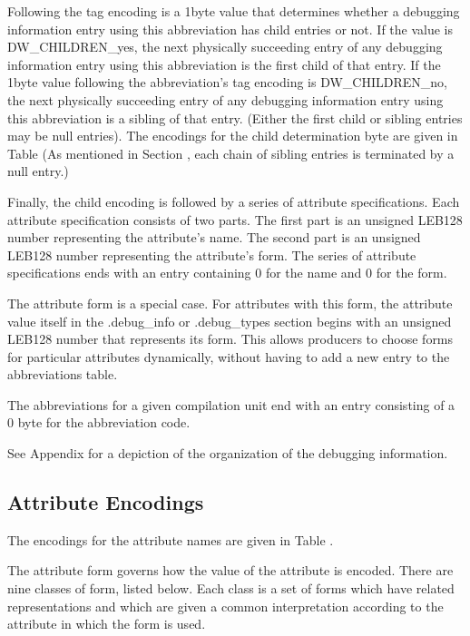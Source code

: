 Following the tag encoding is a 1\dash byte value that determines
whether a debugging information entry using this abbreviation
has child entries or not. If the value is DW\-\_CHILDREN\-\_yes,
the next physically succeeding entry of any debugging
information entry using this abbreviation is the first
child of that entry. If the 1\dash byte value following the
abbreviation’s tag encoding is DW\-\_CHILDREN\-\_no, the next
physically succeeding entry of any debugging information entry
using this abbreviation is a sibling of that entry. (Either
the first child or sibling entries may be null entries). The
encodings for the child determination byte are given in 
Table 
(As mentioned in 
Section , 
each chain of
sibling entries is terminated by a null entry.)

Finally, the child encoding is followed by a series of
attribute specifications. Each attribute specification
consists of two parts. The first part is an unsigned LEB128
number representing the attribute’s name. The second part
is an unsigned LEB128 number representing the attribute’s
form. The series of attribute specifications ends with an
entry containing 0 for the name and 0 for the form.

The attribute form 
 is a special case. For
attributes with this form, the attribute value itself in the
.debug\_info or .debug\_types section begins with an unsigned
LEB128 number that represents its form. This allows producers
to choose forms for particular attributes dynamically,
without having to add a new entry to the abbreviations table.

The abbreviations for a given compilation unit end with an
entry consisting of a 0 byte for the abbreviation code.

See 
Appendix  
for a depiction of the organization of the
debugging information.

\subsection{Attribute Encodings}
\label{datarep:attributeencodings}

The encodings for the attribute names are given in 
Table .

The attribute form governs how the value of the attribute is
encoded. There are nine classes of form, listed below. Each
class is a set of forms which have related representations
and which are given a common interpretation according to the
attribute in which the form is used.

